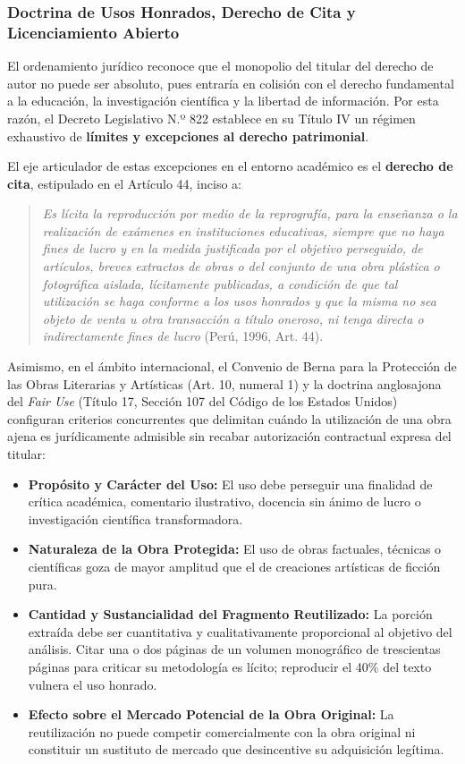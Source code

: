 \subsubsection{Doctrina de Usos Honrados, Derecho de Cita y Licenciamiento Abierto}

El ordenamiento jurídico reconoce que el monopolio del titular del derecho de autor no puede ser absoluto, pues entraría en colisión con el derecho fundamental a la educación, la investigación científica y la libertad de información. Por esta razón, el Decreto Legislativo N.º 822 establece en su Título IV un régimen exhaustivo de \textbf{límites y excepciones al derecho patrimonial}.

El eje articulador de estas excepciones en el entorno académico es el \textbf{derecho de cita}, estipulado en el Artículo 44, inciso a:
\begin{quote}
\small \textit{\textsl{\guillemotleft Es lícita la reproducción por medio de la reprografía, para la enseñanza o la realización de exámenes en instituciones educativas, siempre que no haya fines de lucro y en la medida justificada por el objetivo perseguido, de artículos, breves extractos de obras o del conjunto de una obra plástica o fotográfica aislada, lícitamente publicadas, a condición de que tal utilización se haga conforme a los usos honrados y que la misma no sea objeto de venta u otra transacción a título oneroso, ni tenga directa o indirectamente fines de lucro\guillemotright}} (Perú, 1996, Art. 44).
\end{quote}

Asimismo, en el ámbito internacional, el Convenio de Berna para la Protección de las Obras Literarias y Artísticas (Art. 10, numeral 1) y la doctrina anglosajona del \textit{Fair Use} (Título 17, Sección 107 del Código de los Estados Unidos) configuran criterios concurrentes que delimitan cuándo la utilización de una obra ajena es jurídicamente admisible sin recabar autorización contractual expresa del titular:
\begin{itemize}
    \item \textbf{Propósito y Carácter del Uso:} El uso debe perseguir una finalidad de crítica académica, comentario ilustrativo, docencia sin ánimo de lucro o investigación científica transformadora.
    \item \textbf{Naturaleza de la Obra Protegida:} El uso de obras factuales, técnicas o científicas goza de mayor amplitud que el de creaciones artísticas de ficción pura.
    \item \textbf{Cantidad y Sustancialidad del Fragmento Reutilizado:} La porción extraída debe ser cuantitativa y cualitativamente proporcional al objetivo del análisis. Citar una o dos páginas de un volumen monográfico de trescientas páginas para criticar su metodología es lícito; reproducir el 40\% del texto vulnera el uso honrado.
    \item \textbf{Efecto sobre el Mercado Potencial de la Obra Original:} La reutilización no puede competir comercialmente con la obra original ni constituir un sustituto de mercado que desincentive su adquisición legítima.
\end{itemize}

